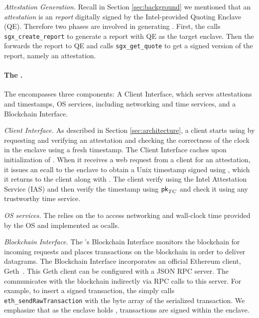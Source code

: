 \vspace{2mm}

\noindent\emph{Attestation Generation.} Recall in Section \ref{sec:background}
we mentioned that an \emph{attestation} is an \emph{report} digitally signed by
the Intel-provided Quoting Enclave (QE).  Therefore two phases are involved in
generating \att. First, the \encname calls \texttt{sgx\_create\_report} to
generate a report with QE as the target enclave. Then the \medname forwards the
report to QE and calls \texttt{sgx\_get\_quote} to get a signed version of the
report, namely an attestation.

\paragraph{The \medname.} The \medname encompasses three components: A Client Interface, which serves attestations and timestamps, OS services, including networking and time services, and a Blockchain Interface. 

\vspace{2mm}

\noindent\emph{Client Interface.} As described in Section \ref{sec:architecture},
a client starts using \tc by requesting and verifying an attestation \att and checking the correctness of the clock in the \tc enclave using a fresh timestamp.
The Client Interface caches \att upon initialization of \engine. When it receives a web request from a client for an attestation,
it issues an ecall to the enclave to obtain a
Unix timestamp signed using \skTC, which it returns to the client along with \att. The client verify \att 
using the Intel Attestation Service (IAS) and then verify the timestamp using ${\sf pk}_{TC}$ and check it using any trustworthy time service. 

\vspace{2mm}

\noindent\emph{OS services.} The \encname relies on the \medname to access networking and 
wall-clock time provided by the OS and implemented as ocalls.

\vspace{2mm}

\noindent\emph{Blockchain Interface.} The \medname's Blockchain Interface monitors the
blockchain for incoming requests and places transactions on the blockchain in order to
deliver datagrams. The Blockchain Interface incorporates an 
official Ethereum client, Geth~\cite{geth}. This Geth client can be configured with a JSON RPC server.  
The \medname  communicates with the blockchain indirectly via RPC calls to this server. For example, to insert a signed transaction, the \medname simply calls
\texttt{eth\_sendRawTransaction} with the byte array of the serialized
transaction. We emphasize that as the enclave holds \skTC, transactions are signed within the enclave.

